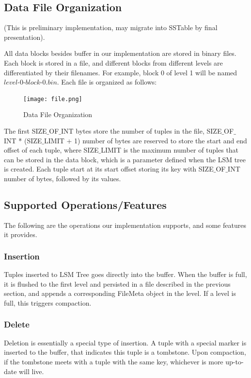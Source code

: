 \documentclass[sigconf]{acmart}
\begin{document}
    \subsection{Data File Organization}
    (This is preliminary implementation, may migrate into SSTable by final presentation).
    
    
    All data blocks besides buffer in our implementation are stored in binary files. Each block is stored in a file, and different blocks from different levels are differentiated by their filenames. For example, block 0 of level 1 will be named $level$-$0$-$block$-$0$.$bin$. Each file is organized as follows: 
    \begin{figure}[H]
        \centering
        \texttt{[image: file.png]}
        \caption{Data File Organization}
        \label{Fig.main1}
    \end{figure}
    The first SIZE$\_$OF$\_$INT bytes store the number of tuples in the file, SIZE$\_$OF$\_$INT * (SIZE$\_$LIMIT + 1) number of bytes are reserved to store the start and end offset of each tuple, where SIZE$\_$LIMIT is the maximum number of tuples that can be stored in the data block, which is a parameter defined when the LSM tree is created. Each tuple start at its start offset storing its key with SIZE$\_$OF$\_$INT number of bytes, followed by its values. 
    
    \subsection{Supported Operations/Features}
    The following are the operations our implementation supports, and some features it provides.
    \subsubsection{Insertion}
    Tuples inserted to LSM Tree goes directly into the buffer. When the buffer is full, it is flushed to the first level and persisted in a file described in the previous section, and appends a corresponding FileMeta object in the level. If a level is full, this triggers compaction.
    \subsubsection{Delete}
    Deletion is essentially a special type of insertion. A tuple with a special marker is inserted to the buffer, that indicates this tuple is a tombstone. Upon compaction, if the tombstone meets with a tuple with the same key, whichever is more up-to-date will live.
\end{document}
